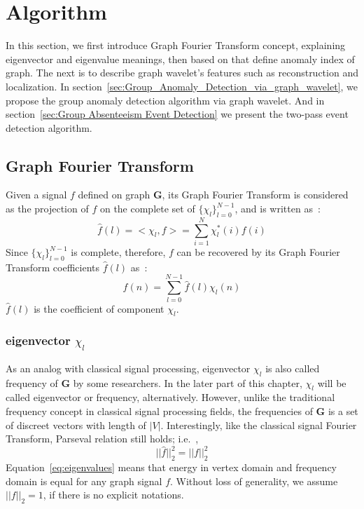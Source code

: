 \section{Algorithm}
\label{sec:algorithm}

In this section, we first introduce Graph Fourier Transform concept, explaining eigenvector and eigenvalue meanings, then based on that define anomaly index of graph. The next is to describe graph wavelet's features such as reconstruction and localization. In section~\ref{sec:Group_Anomaly_Detection_via_graph_wavelet}, we propose the group anomaly detection algorithm via graph wavelet. And in section~\ref{sec:Group Absenteeism Event Detection} we present the two-pass event detection algorithm.

\subsection{Graph Fourier Transform}
\label{sec:Graph_Fourier_Transform}
Given a signal $f$ defined on graph $\mathbf{G}$, its Graph Fourier Transform is considered as the projection of $f$ on the complete set of $\{\chi_l\}_{l=0}^{N-1}$, and is written as~\cite{hammond2011wavelets}:
\begin{equation}
\label{eq:Graph_Fourier_Transform1}
\hat{f}(l)=<\chi_{l},f>=\sum_{i=1}^{N}\chi^*_{l}(i)f(i)
\end{equation}
Since $\{\chi_l\}_{l=0}^{N-1}$ is complete, therefore, $f$ can be recovered by its Graph Fourier Transform coefficients $\hat{f}(l)$ as~\cite{hammond2011wavelets}:
\begin{equation}
\label{eq:Inverser_Graph_Fourier_Transform}
f(n)=\sum_{l=0}^{N-1}\hat{f}(l)\chi_{l}(n)
\end{equation}
$\hat{f}(l)$ is the coefficient of component $\chi_l$.
\subsubsection{eigenvector $\chi_l$}
As an analog with classical signal processing, eigenvector $\chi_l$ is also called frequency of $\mathbf{G}$ by some researchers. In the later part of this chapter, $\chi_l$ will be called eigenvector or frequency, alternatively. However, unlike the traditional frequency concept in classical signal processing fields, the frequencies of $\mathbf{G}$ is a set of discreet vectors with length of $|V|$. Interestingly, like the classical signal Fourier Transform, Parseval relation still holds; i.e.~\cite{shuman2015vertex},
\begin{equation}
\label{eq:Parseval}
||\hat{f}||_2^2=||f||_2^2
\end{equation}
Equation~\ref{eq:eigenvalues} means that energy in vertex domain and frequency domain is equal for any graph signal $f$. Without loss of generality, we assume $||f||_2 =1$, if there is no explicit notations.

